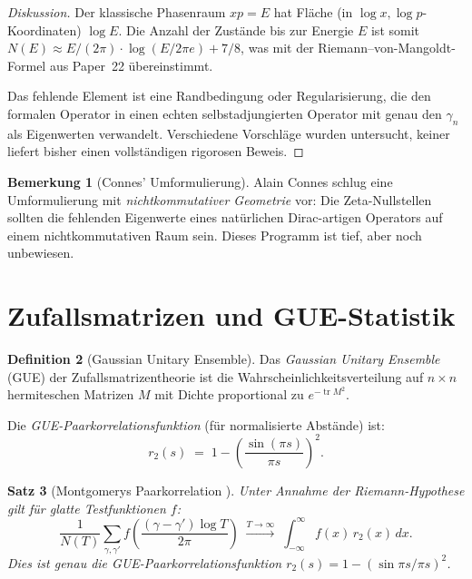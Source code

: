 \documentclass[12pt,a4paper]{amsart}
\newtheorem{theorem}{Satz}[section]
\theoremstyle{definition}
\newtheorem{definition}[theorem]{Definition}
\newtheorem{remark}[theorem]{Bemerkung}
\DeclareMathOperator{\tr}{tr}
\begin{document}
\begin{proof}[Diskussion]
Der klassische Phasenraum $xp = E$ hat Fl\"ache (in $\log x, \log p$-Koordinaten)
$\log E$.
Die Anzahl der Zust\"ande bis zur Energie $E$ ist somit
$N(E) \approx E/(2\pi) \cdot \log(E/2\pi e) + 7/8$,
was mit der Riemann--von-Mangoldt-Formel aus Paper~22 \"ubereinstimmt.

Das fehlende Element ist eine Randbedingung oder Regularisierung,
die den formalen Operator in einen echten selbstadjungierten Operator mit
genau den $\gamma_n$ als Eigenwerten verwandelt.
Verschiedene Vorschl\"age wurden untersucht, keiner liefert bisher
einen vollst\"andigen rigorosen Beweis.
\end{proof}

\begin{remark}[Connes' Umformulierung]
Alain Connes \cite{Connes1999} schlug eine Umformulierung mit
\emph{nichtkommutativer Geometrie} vor: Die Zeta-Nullstellen sollten
die \glqq fehlenden Eigenwerte\grqq{} eines nat\"urlichen
Dirac-artigen Operators auf einem nichtkommutativen Raum sein.
Dieses Programm ist tief, aber noch unbewiesen.
\end{remark}

\section{Zufallsmatrizen und GUE-Statistik}
\label{sec:gue}

\begin{definition}[Gaussian Unitary Ensemble]
\label{def:gue}
Das \emph{Gaussian Unitary Ensemble} (GUE) der Zufallsmatrizentheorie
ist die Wahrscheinlichkeitsverteilung auf $n \times n$ hermiteschen Matrizen $M$
mit Dichte proportional zu $e^{-\tr M^2}$.

Die \emph{GUE-Paarkorrelationsfunktion} (f\"ur normalisierte Abst\"ande) ist:
\[
  r_2(s) \;=\; 1 - \left(\frac{\sin(\pi s)}{\pi s}\right)^2.
\]
\end{definition}

\begin{theorem}[Montgomerys Paarkorrelation \cite{Montgomery1973}]
\label{thm:montgomery_gue}
Unter Annahme der Riemann-Hypothese gilt f\"ur glatte Testfunktionen $f$:
\[
  \frac{1}{N(T)} \sum_{\gamma, \gamma'} f\!\left(\frac{(\gamma-\gamma')\log T}{2\pi}\right)
  \;\xrightarrow{T \to \infty}\;
  \int_{-\infty}^{\infty} f(x)\,r_2(x)\,dx.
\]
Dies ist genau die GUE-Paarkorrelationsfunktion $r_2(s) = 1-(\sin\pi s/\pi s)^2$.
\end{theorem}
\end{document}
